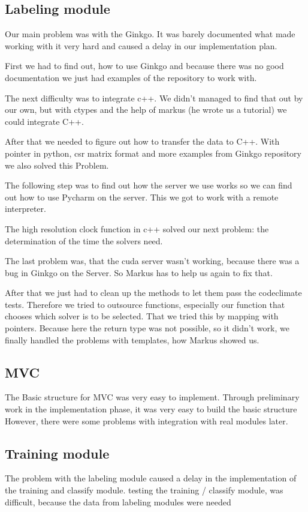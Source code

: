 \documentclass[parskip=full]{scrartcl}
\begin{document}
\subsection{Labeling module}
Our main problem was with the \gls{Ginkgo}. 
It was barely documented what made working with it very hard and caused a delay in our implementation plan. 

First we had to find out, how to use \gls{Ginkgo} and because there was no good documentation we just had examples of the repository to work with.

The next difficulty was to integrate c++.
We didn't managed to find that out by our own, but with ctypes and the help of markus (he wrote us a tutorial) we could integrate C++.

After that we needed to figure out how to transfer the data to C++.
With pointer in python, csr matrix format and more examples from Ginkgo repository we also solved this Problem.

The following step was to find out how the server we use works so we can find out how to use Pycharm on the server.
This we got to work with a remote interpreter.

The high resolution clock function in c++ solved our next problem: the determination of the time the solvers need.

The last problem was, that the cuda server wasn't working, because there was a bug in Ginkgo on the Server.
So Markus has to help us again to fix that.

After that we just had to clean up the methods to let them pass the codeclimate tests.
Therefore we tried to outsource functions, especially our function that chooses which solver is to be selected.
That we tried this by mapping with pointers.
Because here the return type was not possible, so it didn't work, we finally handled the problems with templates, how Markus showed us.

\subsection{MVC}
The Basic structure for MVC was very easy to implement.
Through preliminary work in the implementation phase, it was very easy to build the basic structure 
However, there were some problems with integration with real modules later.
\subsection{Training module}
The problem with the labeling module caused a delay in the implementation of the training and classify module.
testing the training / classify module, was difficult, because the data from labeling modules were needed
\end{document}
